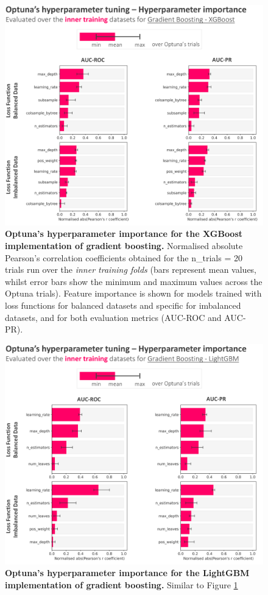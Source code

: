 \documentclass[nhess, manuscript]{copernicus}
\begin{document}
\begin{figure}[t]
\includegraphics[width=12cm]{figures/optuna_parameters_importance_gradient_boosting_xgboost.png}
\caption{\textbf{Optuna's hyperparameter importance for the XGBoost implementation of gradient boosting.} Normalised absolute Pearson's correlation coefficients obtained for the n\_trials = 20 trials run over the \textit{inner training folds} (bars represent mean values, whilst error bars show the minimum and maximum values across the Optuna trials). Feature importance is shown for models trained with loss functions for balanced datasets and specific for imbalanced datasets, and for both evaluation metrics (AUC-ROC and AUC-PR).}
\label{fig:optuna_parameters_importance_gradient_boosting_xgboost}
\end{figure}

\begin{figure}[t]
\includegraphics[width=12cm]{figures/optuna_parameters_importance_gradient_boosting_lightgbm.png}
\caption{\textbf{Optuna's hyperparameter importance for the LightGBM implementation of gradient boosting.} Similar to Figure \ref{fig:optuna_parameters_importance_gradient_boosting_xgboost}}
\label{fig:optuna_parameters_importance_gradient_boosting_lightgbm}
\end{figure}
\end{document}
